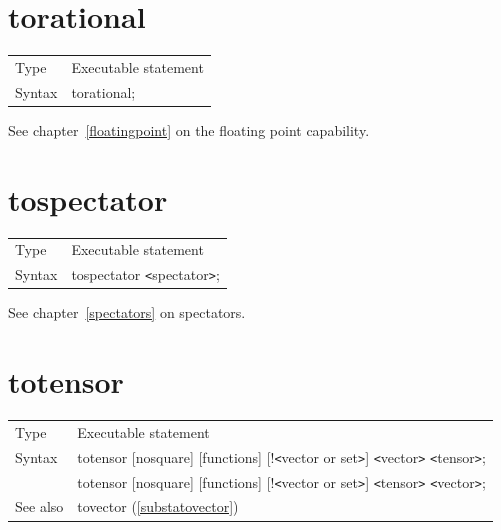 \section{torational}
\label{substatorational}

\noindent \begin{tabular}{ll}
Type & Executable statement\\
Syntax & torational;
\end{tabular} \vspace{4mm}

\noindent See chapter~\ref{floatingpoint} on the floating point capability.
 

\section{tospectator}
\label{substatospectator}

\noindent \begin{tabular}{ll}
Type & Executable statement\\
Syntax & tospectator {\tt<}spectator{\tt>};
\end{tabular} \vspace{4mm}

\noindent See chapter~\ref{spectators} on spectators.
\vspace{10mm}


\section{totensor}
\label{substatotensor}

\noindent \begin{tabular}{ll}
Type & Executable statement\\
Syntax & totensor [nosquare] [functions] [!{\tt<}vector or set{\tt>}] {\tt<}vector{\tt>} {\tt<}tensor{\tt>}; \\
       & totensor [nosquare] [functions] [!{\tt<}vector or set{\tt>}] {\tt<}tensor{\tt>} {\tt<}vector{\tt>};
\\ See also & tovector (\ref{substatovector})
\end{tabular} \vspace{4mm}

